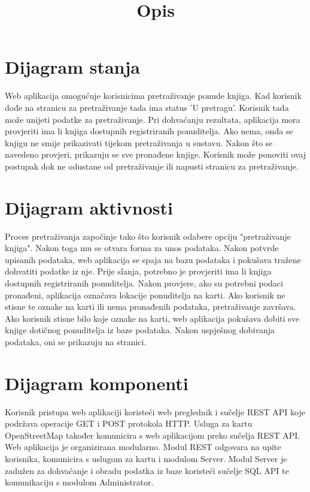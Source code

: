 \documentclass{article}
\title{Opis}
\begin{document}
	
	
	\section*{Dijagram stanja}
	Web aplikacija omogućuje korisnicima pretraživanje ponude knjiga. Kad korisnik dođe na stranicu za pretraživanje tada ima status 'U pretragu'. Korisnik tada može unijeti podatke za pretraživanje. Pri dohvaćanju rezultata, aplikacija mora provjeriti ima li knjiga dostupnih registriranih ponuditelja. Ako nema, onda se knjigu ne smije prikazivati tijekom pretraživanja u sustavu. Nakon što se navedeno provjeri, prikazuju se sve pronađene knjige. Korisnik može ponoviti ovaj postupak dok ne odustane od pretraživanje ili napusti stranicu za pretraživanje. 
	\section*{Dijagram aktivnosti}
	Proces pretraživanja započinje tako što korisnik odabere opciju "pretraživanje knjiga". Nakon toga mu se otvara forma za unos podataka. Nakon potvrde upisanih podataka, web aplikacija se spaja na bazu podataka i pokušava tražene dohvatiti podatke iz nje. Prije slanja, potrebno je provjeriti ima li knjiga dostupnih registriranih ponuditelja. Nakon provjere, ako su potrebni podaci pronađeni, aplikacija označava lokacije ponuditelja na karti. Ako korisnik ne stisne te oznake na karti ili nema pronađenih podataka, pretraživanje završava. Ako korisnik stisne bilo koje oznake na karti, web aplikacija pokušava dobiti sve knjige dotičnog ponuditelja iz baze podataka. Nakon uspješnog dobivanja podataka, oni se prikazuju na stranici.
	\section*{Dijagram komponenti}
	Korisnik pristupa web aplikaciji koristeći web preglednik i sučelje REST API koje podržava operacije GET i POST protokola HTTP. Usluga za kartu OpenStreetMap također komunicira s web aplikacijom preko sučelja REST API. Web aplikacija je organizirana modularno. Modul REST odgovara na upite korisnika, komunicira s uslugom za kartu i modulom Server. Modul Server je zadužen za dohvaćanje i obradu podatka iz baze koristeći sučelje SQL API te komunikaciju s modulom Administrator.
	
	
\end{document}
